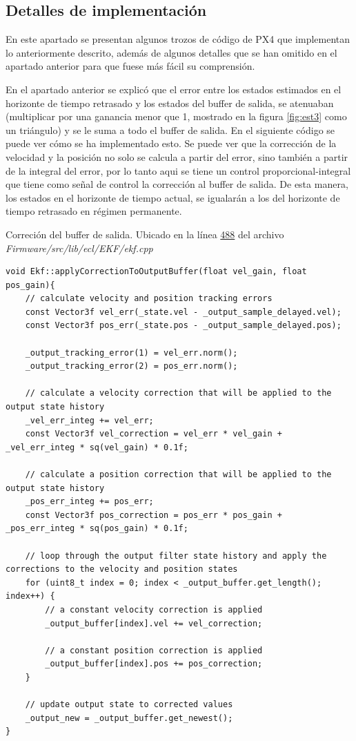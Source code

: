 



\subsection{Detalles de implementación}
En este apartado se presentan algunos trozos de código de PX4 que implementan lo anteriormente descrito, además de algunos detalles que se han omitido en el apartado anterior para que fuese más fácil su comprensión.

En el apartado anterior se explicó que el error entre los estados estimados en el horizonte de tiempo retrasado y los estados del buffer de salida, se atenuaban (multiplicar por una ganancia menor que 1, mostrado en la figura \ref{fig:est3} como un triángulo) y se le suma a todo el buffer de salida. En el siguiente código se puede ver cómo se ha implementado esto. Se puede ver que la corrección de la velocidad y la posición no solo se calcula a partir del error, sino también a partir de la integral del error, por lo tanto aqui se tiene un control proporcional-integral que tiene como señal de control la corrección al buffer de salida. De esta manera, los estados en el horizonte de tiempo actual, se igualarán a los del horizonte de tiempo retrasado en régimen permanente. 

\begin{codigo}{Correción del buffer de salida. Ubicado en  la línea \href{https://github.com/PX4/PX4-ECL/blob/ec934908900b23ee273d1a9f82364b7b38423200/EKF/ekf.cpp\#L488}{488} del archivo \textit{Firmware/src/lib/ecl/EKF/ekf.cpp}}
\begin{verbatim}
void Ekf::applyCorrectionToOutputBuffer(float vel_gain, float pos_gain){
	// calculate velocity and position tracking errors
	const Vector3f vel_err(_state.vel - _output_sample_delayed.vel);
	const Vector3f pos_err(_state.pos - _output_sample_delayed.pos);

	_output_tracking_error(1) = vel_err.norm();
	_output_tracking_error(2) = pos_err.norm();

	// calculate a velocity correction that will be applied to the output state history
	_vel_err_integ += vel_err;
	const Vector3f vel_correction = vel_err * vel_gain + _vel_err_integ * sq(vel_gain) * 0.1f;

	// calculate a position correction that will be applied to the output state history
	_pos_err_integ += pos_err;
	const Vector3f pos_correction = pos_err * pos_gain + _pos_err_integ * sq(pos_gain) * 0.1f;

	// loop through the output filter state history and apply the corrections to the velocity and position states
	for (uint8_t index = 0; index < _output_buffer.get_length(); index++) {
		// a constant velocity correction is applied
		_output_buffer[index].vel += vel_correction;

		// a constant position correction is applied
		_output_buffer[index].pos += pos_correction;
	}

	// update output state to corrected values
	_output_new = _output_buffer.get_newest();
}
\end{verbatim}
\end{codigo} 

